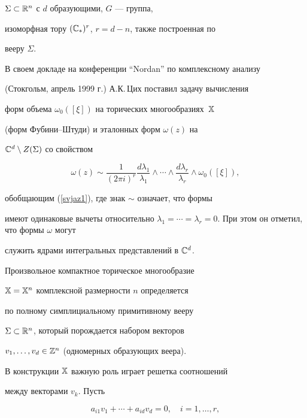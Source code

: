 $\Sigma\subset\Bbb{R}^n$ с $d$ образующими,  $G$ --- группа,


изоморфная тору $(\Bbb{C}_*)^r$, $r=d-n$, также построенная по


вееру $\Sigma$. 





В своем докладе на конференции ``Nordan'' по комплексному анализу


(Стокгольм, апрель 1999 г.) А.К.\,Цих поставил задачу вычисления


форм объема $\omega_0([\xi])$ на торических многообразиях~$\Bbb{X}$


(форм Фубини--Штуди) и эталонных форм $\omega(z)$ на 


$\Bbb{C}^d\setminus Z(\Sigma)$ со свойством


$$


\omega(z)\sim\frac1{(2\pi i)^r}


\frac{d\lambda_1}{\lambda_1}\wedge\dotsb\wedge\frac{d\lambda_r}


{\lambda_r}\wedge\omega_0([\xi]),


$$


обобщающим (\ref{svjaz1}), где знак $\sim$ означает, что формы


имеют одинаковые вычеты относительно $\lambda_1=\dotsb


=\lambda_r=0$. При этом он отметил, что формы $\omega$ могут


служить ядрами интегральных представлений в $\Bbb{C}^d$.





Произвольное компактное торическое многообразие


$\Bbb{X}=\Bbb{X}^n$ комплексной размерности $n$ определяется


по полному симплициальному примитивному вееру


$\Sigma\subset\Bbb{R}^n$, который порождается набором векторов


$v_1,\dotsc,v_d\in\Bbb{Z}^n$ (одномерных образующих веера).





В конструкции ${\Bbb X}$ важную роль играет решетка соотношений


между векторами $v_k$. Пусть


\begin{equation}


a_{i1}v_1+ \dotsb +a_{id}v_d=0,\quad i=1,\dotsc,r,


\label{system}


\end{equation} 


